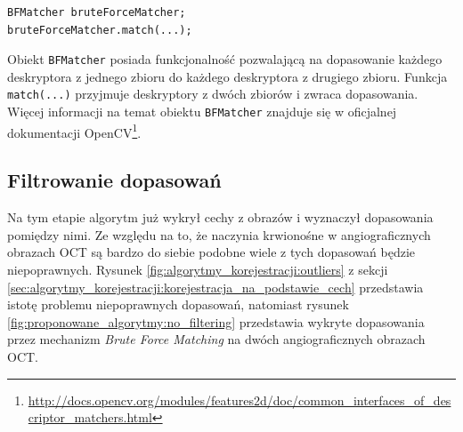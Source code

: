 \begin{verbatim}
BFMatcher bruteForceMatcher;
bruteForceMatcher.match(...);
\end{verbatim}

Obiekt \texttt{BFMatcher} posiada funkcjonalność pozwalającą na dopasowanie każdego deskryptora z jednego zbioru do każdego deskryptora z drugiego zbioru. Funkcja \texttt{match(...)} przyjmuje deskryptory z dwóch zbiorów i zwraca dopasowania. Więcej informacji na temat obiektu \texttt{BFMatcher} znajduje się w oficjalnej dokumentacji OpenCV\footnote{\url{http://docs.opencv.org/modules/features2d/doc/common_interfaces_of_descriptor_matchers.html}}.

\subsection{Filtrowanie dopasowań}
\label{sec:proponowane_algorytmy:filtrowanie}

Na tym etapie algorytm już wykrył cechy z obrazów i wyznaczył dopasowania pomiędzy nimi. Ze względu na to, że naczynia krwionośne w angiograficznych obrazach OCT są bardzo do siebie podobne wiele z tych dopasowań będzie niepoprawnych. Rysunek \ref{fig:algorytmy_korejestracji:outliers} z sekcji \ref{sec:algorytmy_korejestracji:korejestracja_na_podstawie_cech} przedstawia istotę problemu niepoprawnych dopasowań, natomiast rysunek \ref{fig:proponowane_algorytmy:no_filtering} przedstawia wykryte dopasowania przez mechanizm \textit{Brute Force Matching} na dwóch angiograficznych obrazach OCT.

